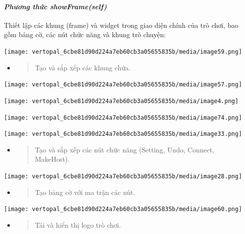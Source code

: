 \documentclass[a4paper]{article}
\begin{document}
\hypertarget{phux1b0ux1a1ng-thux1ee9c-showframeself}{%
\paragraph{\texorpdfstring{\emph{Phương thức
showFrame(self)}}{Phương thức showFrame(self)}}\label{phux1b0ux1a1ng-thux1ee9c-showframeself}}

Thiết lập các khung (frame) và widget trong giao diện chính của trò
chơi, bao gồm bảng cờ, các nút chức năng và khung trò chuyện:

\texttt{[image: vertopal\_6cbe81d90d224a7eb60cb3a05655835b/media/image59.png]}

\begin{itemize}
\item
  \begin{quote}
  Tạo và sắp xếp các khung chứa.
  \end{quote}
\end{itemize}

\texttt{[image: vertopal\_6cbe81d90d224a7eb60cb3a05655835b/media/image57.png]}

\texttt{[image: vertopal\_6cbe81d90d224a7eb60cb3a05655835b/media/image4.png]}

\texttt{[image: vertopal\_6cbe81d90d224a7eb60cb3a05655835b/media/image74.png]}

\texttt{[image: vertopal\_6cbe81d90d224a7eb60cb3a05655835b/media/image33.png]}

\begin{itemize}
\item
  \begin{quote}
  Tạo và sắp xếp các nút chức năng (Setting, Undo, Connect, MakeHost).
  \end{quote}
\end{itemize}

\texttt{[image: vertopal\_6cbe81d90d224a7eb60cb3a05655835b/media/image28.png]}

\begin{itemize}
\item
  \begin{quote}
  Tạo bảng cờ với ma trận các nút.
  \end{quote}
\end{itemize}

\texttt{[image: vertopal\_6cbe81d90d224a7eb60cb3a05655835b/media/image60.png]}

\begin{itemize}
\item
  \begin{quote}
  Tải và hiển thị logo trò chơi.
  \end{quote}
\end{itemize}
\end{document}
